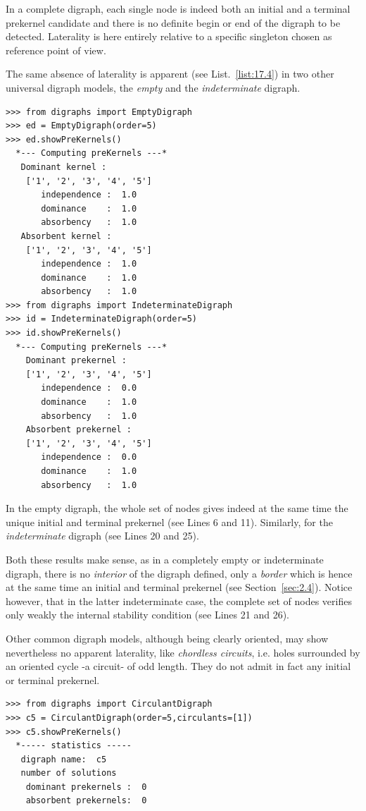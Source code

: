 In a complete digraph, each single node is indeed both an initial and a terminal prekernel candidate and there is no definite begin or end of the digraph to be detected. Laterality is here entirely relative to a specific singleton chosen as reference point of view.

The same absence of laterality is apparent (see List.~\vref{list:17.4}) in two other universal digraph models, the \emph{empty} and the \emph{indeterminate} digraph. 
\begin{lstlisting}[caption={The prekernels of the empty or indeterminate digraph},label=list:17.4]
>>> from digraphs import EmptyDigraph
>>> ed = EmptyDigraph(order=5)
>>> ed.showPreKernels()
  *--- Computing preKernels ---*
   Dominant kernel :
    ['1', '2', '3', '4', '5']
       independence :  1.0 
       dominance    :  1.0
       absorbency   :  1.0
   Absorbent kernel :
    ['1', '2', '3', '4', '5']
       independence :  1.0 
       dominance    :  1.0
       absorbency   :  1.0
>>> from digraphs import IndeterminateDigraph
>>> id = IndeterminateDigraph(order=5)
>>> id.showPreKernels()
  *--- Computing preKernels ---*
    Dominant prekernel :
    ['1', '2', '3', '4', '5']
       independence :  0.0
       dominance    :  1.0
       absorbency   :  1.0
    Absorbent prekernel :
    ['1', '2', '3', '4', '5']
       independence :  0.0
       dominance    :  1.0
       absorbency   :  1.0
\end{lstlisting}

In the empty digraph, the whole set of nodes gives indeed at the same time the unique initial and terminal prekernel (see Lines 6 and 11). Similarly, for the \emph{indeterminate} digraph (see Lines 20 and 25).

Both these results make sense, as in a completely empty or indeterminate digraph, there is no \emph{interior} of the digraph defined, only a \emph{border} which is hence at the same time an initial and terminal prekernel (see Section~\vref{sec:2.4}).  Notice however, that in the latter indeterminate case, the complete set of nodes verifies only weakly the internal stability condition (see Lines 21 and 26).

Other common digraph models, although being clearly oriented, may show nevertheless no apparent laterality, like \emph{chordless circuits}, i.e. holes surrounded by an oriented cycle -a circuit- of odd length. They do not admit in fact any initial or terminal prekernel.
\begin{lstlisting}[caption={The prekernels of the 5-circuit digraph},label=list:17.5]
>>> from digraphs import CirculantDigraph
>>> c5 = CirculantDigraph(order=5,circulants=[1])
>>> c5.showPreKernels()
  *----- statistics -----
   digraph name:  c5
   number of solutions
    dominant prekernels :  0
    absorbent prekernels:  0
\end{lstlisting}

